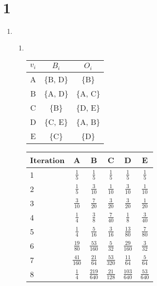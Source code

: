 \documentclass[ngerman]{scrartcl}
\begin{document}
\section*{1}
  \begin{enumerate}[label=\alph*)]
    \item
      \begin{enumerate}
        \item
        \ 
        \begin{tabular}{|*{3}{c|}}
          \hline
          $v_i$ & $B_i$ & $O_i$ \\
          \hline
          A & \{B, D\} & \{B\}    \\
          \hline
          B & \{A, D\} & \{A, C\} \\
          \hline
          C & \{B\}    & \{D, E\} \\
          \hline
          D & \{C, E\} & \{A, B\} \\
          \hline
          E & \{C\}    & \{D\}    \\
          \hline
        \end{tabular}

        \begin{doublespacing}
          \begin{tabular}{|l|*{5}{c|}}
            \hline
            Iteration & A & B & C & D & E \\
            \hline
            1 & $\frac{1}{5}$ & $\frac{1}{5}$ & $\frac{1}{5}$ & $\frac{1}{5}$ & $\frac{1}{5}$ \\
            \hline
            2 & $\frac{1}{5}$ & $\frac{3}{10}$ & $\frac{1}{10}$ & $\frac{3}{10}$ & $\frac{1}{10}$ \\
            \hline
            3 & $\frac{3}{10}$ & $\frac{7}{20}$ & $\frac{3}{20}$ & $\frac{3}{20}$ & $\frac{1}{20}$ \\
            \hline
            4 & $\frac{1}{4}$ & $\frac{3}{8}$ & $\frac{7}{40}$ & $\frac{1}{8}$ & $\frac{3}{40}$ \\
            \hline
            5 & $\frac{1}{4}$ & $\frac{5}{16}$ & $\frac{3}{16}$ & $\frac{13}{80}$ & $\frac{7}{80}$ \\
            \hline
            6 & $\frac{19}{80}$ & $\frac{53}{160}$ & $\frac{5}{32}$ & $\frac{29}{160}$ & $\frac{3}{32}$ \\
            \hline
            7 & $\frac{41}{160}$ & $\frac{21}{64}$ & $\frac{53}{320}$ & $\frac{11}{64}$ & $\frac{5}{64}$ \\
            \hline
            8 & $\frac{1}{4}$ & $\frac{219}{640}$ & $\frac{21}{128}$ & $\frac{103}{640}$ & $\frac{53}{640}$ \\
            \hline
          \end{tabular}
        \end{doublespacing}


\end{enumerate}
\end{enumerate}
\end{document}
